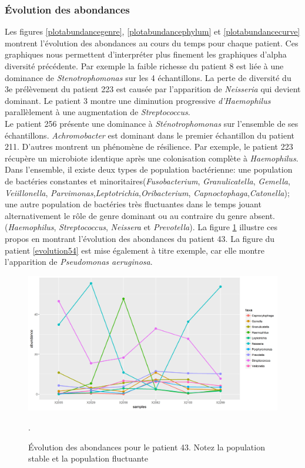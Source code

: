 \documentclass[12pt,a4paper]{article}
\begin{document}
\subsubsection{Évolution des abondances}
Les figures \ref{plotabundancegenre}, \ref{plotabundancephylum} et \ref{plotabundancecurve} montrent l’évolution des abondances au cours du temps pour chaque patient. Ces graphiques nous permettent d’interpréter plus finement les graphiques d’alpha diversité précédente.
Par exemple la faible richesse du patient 8 est liée à une dominance de \textit{Stenotrophomonas} sur les 4 échantillons.
La perte de diversité du 3e prélèvement du patient 223 est causée par l'apparition de \textit{Neisseria} qui devient dominant.
Le patient 3 montre une diminution progressive \textit{d’Haemophilus} parallèlement à une augmentation de \textit{Streptococcus}. \\
Le patient 256 présente une dominance à \textit{Sténotrophomonas} sur l'ensemble de ses échantillons. \textit{Achromobacter} est dominant dans le premier échantillon du patient 211.
D’autres montrent un phénomène de résilience. Par exemple, le patient 223 récupère un microbiote identique après une colonisation complète à \textit{Haemophilus}. \\
Dans l’ensemble, il existe deux types de population bactérienne: une population de bactéries constantes et minoritaires(\textit{Fusobacterium}, \textit{Granulicatella}, \textit{Gemella}, \textit{Veiillonella}, \textit{Parvimonas},\textit{Leptotrichia},\textit{Oribacterium}, \textit{Capnoctophaga},\textit{Catonella}); une autre population de bactéries très fluctuantes dans le temps jouant alternativement le rôle de genre dominant ou au contraire du genre absent. (\textit{Haemophilus}, \textit{Streptococcus}, \textit{Neissera} et \textit{Prevotella}).
La figure \ref{evolution43} illustre ces propos en montrant l'évolution des abondances du patient 43.
La figure du patient \ref{evolution54} est mise également à titre exemple, car elle montre l’apparition de \textit{Pseudomonas aeruginosa}. \\


\begin{figure}
\begin{center}
\includegraphics[scale=0.60]{img/curve_043.png}\hfill
\end{center}
\caption{Évolution des abondances pour le patient 43. Notez la population stable et la population fluctuante}.
\label{evolution43}
\end{figure}
\end{document}
